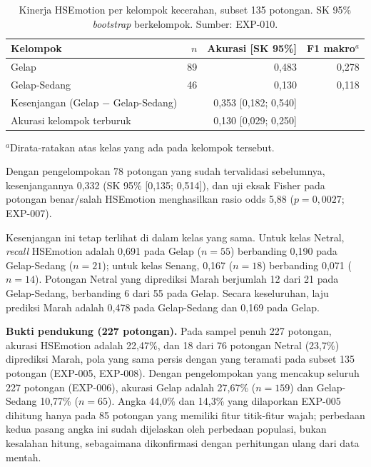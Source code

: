 \begin{table}[htbp]
\centering
\caption[Kinerja HSEmotion per kelompok kecerahan]{Kinerja HSEmotion per kelompok kecerahan, subset 135 potongan. SK 95\% \textit{bootstrap} berkelompok. Sumber: EXP-010.}
\label{tab:rq1-groups}
\begin{tabular}{lrrr}
\toprule
Kelompok & $n$ & Akurasi [SK 95\%] & F1 makro$^{a}$ \\
\midrule
Gelap & 89 & 0,483 & 0,278 \\
Gelap-Sedang & 46 & 0,130 & 0,118 \\
\midrule
Kesenjangan (Gelap $-$ Gelap-Sedang) & & 0,353 [0,182; 0,540] & \\
Akurasi kelompok terburuk & & 0,130 [0,029; 0,250] & \\
\bottomrule
\end{tabular}

\vspace{2pt}
{\footnotesize $^{a}$Dirata-ratakan atas kelas yang ada pada kelompok tersebut.}
\end{table}

Dengan pengelompokan 78 potongan yang sudah tervalidasi sebelumnya, kesenjangannya 0,332 (SK 95\% [0,135; 0,514]), dan uji eksak Fisher pada potongan benar/salah HSEmotion menghasilkan rasio odds 5,88 ($p = 0,0027$; EXP-007).

Kesenjangan ini tetap terlihat di dalam kelas yang sama. Untuk kelas Netral, \textit{recall} HSEmotion adalah 0,691 pada Gelap ($n = 55$) berbanding 0,190 pada Gelap-Sedang ($n = 21$); untuk kelas Senang, 0,167 ($n = 18$) berbanding 0,071 ($n = 14$). Potongan Netral yang diprediksi Marah berjumlah 12 dari 21 pada Gelap-Sedang, berbanding 6 dari 55 pada Gelap. Secara keseluruhan, laju prediksi Marah adalah 0,478 pada Gelap-Sedang dan 0,169 pada Gelap.

\textbf{Bukti pendukung (227 potongan).} Pada sampel penuh 227 potongan, akurasi HSEmotion adalah 22,47\%, dan 18 dari 76 potongan Netral (23,7\%) diprediksi Marah, pola yang sama persis dengan yang teramati pada subset 135 potongan (EXP-005, EXP-008). Dengan pengelompokan yang mencakup seluruh 227 potongan (EXP-006), akurasi Gelap adalah 27,67\% ($n = 159$) dan Gelap-Sedang 10,77\% ($n = 65$). Angka 44,0\% dan 14,3\% yang dilaporkan EXP-005 dihitung hanya pada 85 potongan yang memiliki fitur titik-fitur wajah; perbedaan kedua pasang angka ini sudah dijelaskan oleh perbedaan populasi, bukan kesalahan hitung, sebagaimana dikonfirmasi dengan perhitungan ulang dari data mentah.

